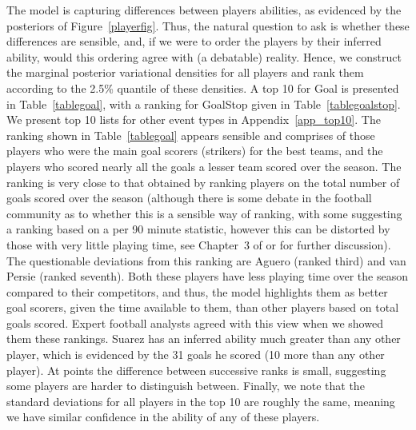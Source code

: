 \documentclass[11pt,a4paper]{article}
\begin{document}
The model is capturing differences between players abilities, 
as evidenced by the posteriors of Figure~\ref{playerfig}. Thus, the 
natural question to ask is whether these differences are sensible, and,
if we were to order the players by their inferred ability, would this 
ordering agree with (a debatable) reality. Hence, we construct the 
marginal posterior variational densities for all players and rank them 
according to the 2.5\% quantile of these densities. A top 10 for Goal 
is presented in Table~\ref{tablegoal}, with a ranking for GoalStop 
given in Table~\ref{tablegoalstop}. We present top 10 lists for other 
event types in Appendix~\ref{app_top10}. The ranking shown in 
Table~\ref{tablegoal} appears sensible and comprises of those players 
who were the main goal scorers (strikers) for the best teams, and the 
players who scored nearly all the goals a lesser team scored over the 
season. The ranking is very close to that obtained by ranking players 
on the total number of goals scored over the season (although there is 
some debate in the football community as to whether this is a sensible 
way of ranking, with some suggesting a ranking based on a per 90 minute 
statistic, however this can be distorted by those with very little 
playing time, see Chapter~3 of \cite{anderson_2013} or \cite{AGR_2016} for further discussion). 
The questionable deviations from this ranking are Aguero 
(ranked third) and van Persie (ranked seventh). Both these players have 
less playing time over the season compared to their competitors, and 
thus, the model highlights them as better goal scorers, given the time 
available to them, than other players based on total goals scored. 
Expert football analysts agreed with this view when we showed them 
these rankings. Suarez has an inferred ability much greater than any other player, 
which is evidenced by the 31 goals he scored (10 more than any other 
player). At points the difference between successive ranks is small, 
suggesting some players are harder to distinguish between. Finally, we 
note that the standard deviations for all players in the top 10 are 
roughly the same, meaning we have similar confidence in the ability 
of any of these players. 
\end{document}
